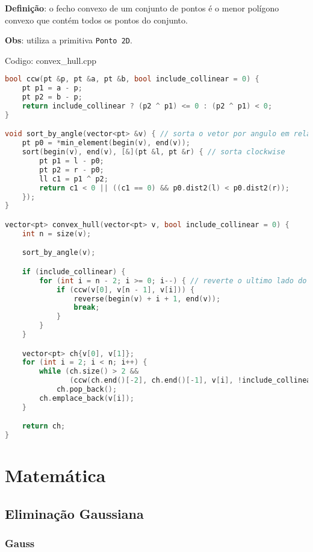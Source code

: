 \documentclass[10pt, a4paper, oneside]{book}
\begin{document}
\textbf{Definição}: o fecho convexo de um conjunto de pontos é o menor polígono convexo que contém todos os pontos do conjunto.



\textbf{Obs}: utiliza a primitiva \texttt{Ponto 2D}. 

\hfill

Codigo: convex\_hull.cpp

\begin{lstlisting}[language=C++]
bool ccw(pt &p, pt &a, pt &b, bool include_collinear = 0) {
    pt p1 = a - p;
    pt p2 = b - p;
    return include_collinear ? (p2 ^ p1) <= 0 : (p2 ^ p1) < 0;
}

void sort_by_angle(vector<pt> &v) { // sorta o vetor por angulo em relacao ao pivo
    pt p0 = *min_element(begin(v), end(v));
    sort(begin(v), end(v), [&](pt &l, pt &r) { // sorta clockwise
        pt p1 = l - p0;
        pt p2 = r - p0;
        ll c1 = p1 ^ p2;
        return c1 < 0 || ((c1 == 0) && p0.dist2(l) < p0.dist2(r));
    });
}

vector<pt> convex_hull(vector<pt> v, bool include_collinear = 0) {
    int n = size(v);

    sort_by_angle(v);

    if (include_collinear) {
        for (int i = n - 2; i >= 0; i--) { // reverte o ultimo lado do poligono
            if (ccw(v[0], v[n - 1], v[i])) {
                reverse(begin(v) + i + 1, end(v));
                break;
            }
        }
    }

    vector<pt> ch{v[0], v[1]};
    for (int i = 2; i < n; i++) {
        while (ch.size() > 2 &&
               (ccw(ch.end()[-2], ch.end()[-1], v[i], !include_collinear)))
            ch.pop_back();
        ch.emplace_back(v[i]);
    }

    return ch;
}\end{lstlisting}
\hfill

\newpage

%
%
%
%

\chapter{Matemática}

\section{Eliminação Gaussiana}
\subsection{Gauss}
\end{document}
